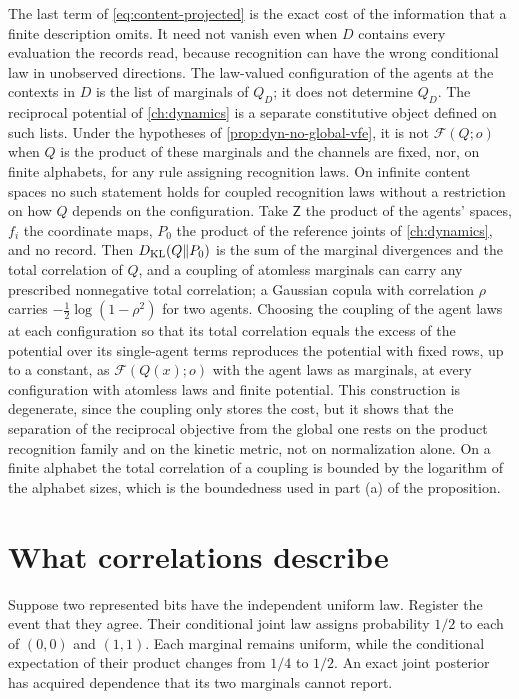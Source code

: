 The last term of \cref{eq:content-projected} is the exact cost of the information that a finite description omits. It need not vanish even when $D$ contains every evaluation the records read, because recognition can have the wrong conditional law in unobserved directions. The law-valued configuration of the agents at the contexts in $D$ is the list of marginals of $Q_D$; it does not determine $Q_D$. The reciprocal potential of \cref{ch:dynamics} is a separate constitutive object defined on such lists. Under the hypotheses of \cref{prop:dyn-no-global-vfe}, it is not $\mathcal F(Q;o)$ when $Q$ is the product of these marginals and the channels are fixed, nor, on finite alphabets, for any rule assigning recognition laws. On infinite content spaces no such statement holds for coupled recognition laws without a restriction on how $Q$ depends on the configuration. Take $\mathsf Z$ the product of the agents' spaces, $f_i$ the coordinate maps, $P_0$ the product of the reference joints of \cref{ch:dynamics}, and no record. Then $D_{\mathrm{KL}}(Q\Vert P_0)$ is the sum of the marginal divergences and the total correlation of $Q$, and a coupling of atomless marginals can carry any prescribed nonnegative total correlation; a Gaussian copula with correlation $\rho$ carries $-\tfrac12\log(1-\rho^2)$ for two agents. Choosing the coupling of the agent laws at each configuration so that its total correlation equals the excess of the potential over its single-agent terms reproduces the potential with fixed rows, up to a constant, as $\mathcal F(Q(x);o)$ with the agent laws as marginals, at every configuration with atomless laws and finite potential. This construction is degenerate, since the coupling only stores the cost, but it shows that the separation of the reciprocal objective from the global one rests on the product recognition family and on the kinetic metric, not on normalization alone. On a finite alphabet the total correlation of a coupling is bounded by the logarithm of the alphabet sizes, which is the boundedness used in part (a) of the proposition.

\section{What correlations describe}

Suppose two represented bits have the independent uniform law. Register the event that they agree. Their conditional joint law assigns probability $1/2$ to each of $(0,0)$ and $(1,1)$. Each marginal remains uniform, while the conditional expectation of their product changes from $1/4$ to $1/2$. An exact joint posterior has acquired dependence that its two marginals cannot report.

